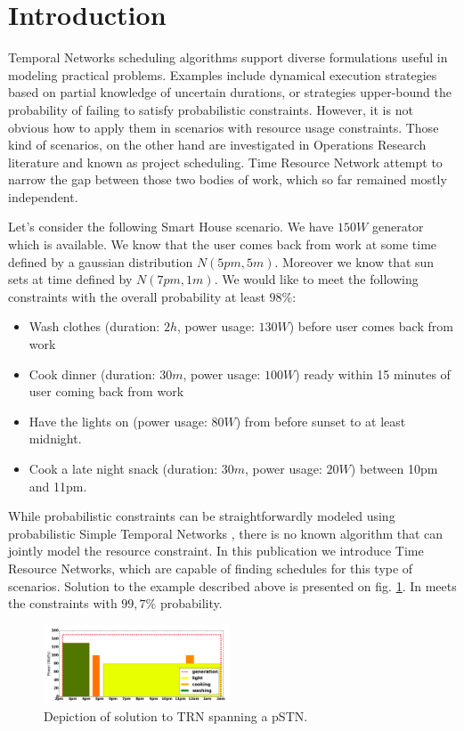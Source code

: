 \section{Introduction}
Temporal Networks scheduling algorithms support diverse formulations useful in modeling practical problems. Examples include dynamical execution strategies based on partial knowledge of uncertain durations, or strategies upper-bound the probability of failing to satisfy probabilistic constraints. However, it is not obvious how to apply them in scenarios with resource usage constraints. Those kind of scenarios, on the other hand are investigated in Operations Research literature and known as project scheduling. Time Resource Network attempt to narrow the gap between those two bodies of work, which so far remained mostly independent.

Let's consider the following Smart House scenario. We have $150W$ generator which is available. We know that the user comes back from work at some time defined by a gaussian distribution $N(5pm, 5m)$. Moreover we know that sun sets at time defined by $N(7pm, 1m)$. We would like to meet the following constraints with the overall probability at least $98\%$:
\begin{itemize}
\item Wash clothes (duration: $2h$, power usage: $130W$) before user comes back from work
\item Cook dinner (duration: $30m$, power usage: $100W$) ready within 15 minutes of user coming back from work
\item Have the lights on (power usage: $80W$) from before sunset to at least midnight.
\item Cook a late night snack (duration: $30m$, power usage: $20W$) between 10pm and 11pm.
\end{itemize}
While probabilistic constraints can be straightforwardly modeled using probabilistic Simple Temporal Networks \cite{Fang2014}, there is no known algorithm that can jointly model the resource constraint. In this publication we introduce Time Resource Networks, which are capable of finding schedules for this type of scenarios. Solution to the example described above is presented on fig. \ref{fig:pstnu_scheduling}. In meets the constraints with $99,7\%$ probability.


\begin{figure}[H]
\begin{center}
\includegraphics[width=0.49\textwidth]{pstnu_scheduling}
\caption{Depiction of solution to TRN spanning a pSTN.}
\label{fig:pstnu_scheduling}
\end{center}
\end{figure}
